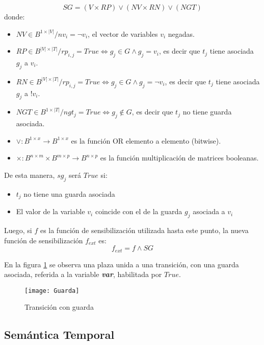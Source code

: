 $$ SG = (V \times RP) \vee ( NV \times RN) \vee (NGT) $$
donde:
\begin{itemize}
  \item $NV \in B^{1 \times \left\vert V \right\vert} \slash  nv_{i} = \neg
  v_{i}$, el vector de variables $v_{i}$ negadas.
  \item $RP \in B^{\left\vert V \right\vert \times \left\vert T 
  \right\vert} \slash rp_{i,j} = True \Leftrightarrow g_{j} \in G \land g_{j} =
  v_{i} $, es decir que $t_{j}$ tiene asociada $g_{j}$ a $v_{i}$.
  \item $RN \in B^{\left\vert V \right\vert \times \left\vert T 
  \right\vert} \slash rp_{i,j} = True \Leftrightarrow g_{j} \in G \land g_{j} =
  \neg v_{i} $, es decir que $t_{j}$ tiene asociada $g_{j}$ a $!v_{i}$.
  \item $NGT \in B^{1 \times \left\vert T \right\vert} \slash ngt_{j} = True
  \Leftrightarrow g_{j} \not \in G$, es decir que $t_{j}$ no tiene guarda
  asociada.
  \item $\vee: B^{1 \times x} \rightarrow B^{1 \times x}$ es la
  función OR elemento a elemento (bitwise).
  \item $\times: B^{n \times m} \times B^{m \times p} \rightarrow B^{n \times
  p}$ es la función multiplicación de matrices booleanas.
\end{itemize}

De esta manera, $sg_{j}$ será $True$ si:
\begin{itemize}
  \item $t_{j}$ no tiene una guarda asociada
  \item El valor de la variable $v_{i}$ coincide con el de la guarda $g_{j}$
  asociada a $v_{i}$
\end{itemize}

Luego, si $f$ es la función de sensibilización utilizada hasta este punto, la
nueva función de sensibilización $f_{ext}$ es:
$$ f_{ext} = f \land SG $$

En la figura \ref{fig:guarda} se observa una plaza unida a una transición,
con una guarda asociada, referida a la variable \textit{\textbf{var}},
habilitada por $True$.

\begin{figure}[h]
  \centering
  \texttt{[image: Guarda]}
  \caption{Transición con guarda}
  \label{fig:guarda}
\end{figure}

\subsection{Semántica Temporal}

